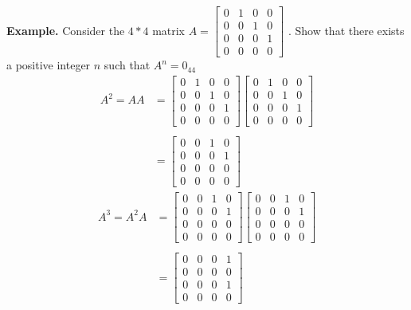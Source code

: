 \documentclass{jhwhw}
\theoremstyle{definition}
\theoremstyle{remark}
\theoremstyle{example}
\begin{document}
\textbf{Example.}
Consider the \(4*4\) matrix \(A = \begin{bmatrix} 0 & 1 & 0 & 0 \\ 0 & 0 & 1 & 0 \\ 0 & 0 & 0 & 1 \\ 0 & 0 & 0 & 0 \end{bmatrix}\) . Show that there exists a positive integer \(n\) such that \(A^n = 0_{44}\)
\begin{align*} A^2 = AA &= \begin{bmatrix} 0 & 1 & 0 & 0 \\ 0 & 0 & 1 & 0 \\ 0 & 0 & 0 & 1 \\ 0 & 0 & 0 & 0  \end{bmatrix} \begin{bmatrix} 0 & 1 & 0 & 0 \\ 0 & 0 & 1 & 0 \\ 0 & 0 & 0 & 1 \\ 0 & 0 & 0 & 0  \end{bmatrix}\\ \\
&= \begin{bmatrix} 0 & 0 & 1 & 0 \\ 0 & 0 & 0 & 1 \\ 0 & 0 & 0 & 0 \\ 0 & 0 & 0 & 0  \end{bmatrix}
\end{align*}
\begin{align*} 
    A^3 = A^2 A &= \begin{bmatrix} 0 & 0 & 1 & 0 \\ 0 & 0 & 0 & 1 \\ 0 & 0 & 0 & 0 \\ 0 & 0 & 0 & 0  \end{bmatrix} \begin{bmatrix} 0 & 0 & 1 & 0 \\ 0 & 0 & 0 & 1 \\ 0 & 0 & 0 & 0 \\ 0 & 0 & 0 & 0  \end{bmatrix}\\ \\
&= \begin{bmatrix} 0 & 0 & 0 & 1 \\ 0 & 0 & 0 & 0 \\ 0 & 0 & 0 & 1 \\ 0 & 0 & 0 & 0  \end{bmatrix}
\end{align*}
\end{document}
